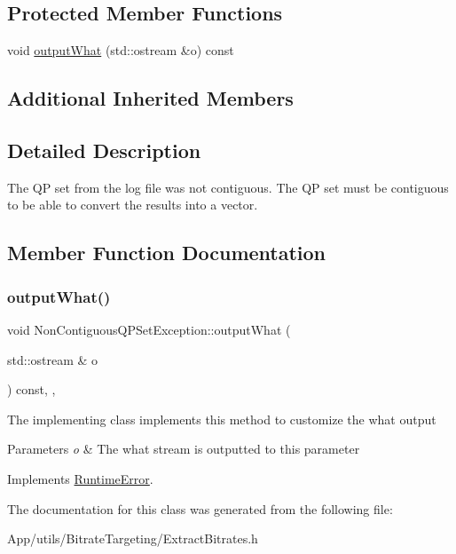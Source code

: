 \subsection*{Protected Member Functions}
\begin{DoxyCompactItemize}
\item 
void \hyperlink{class_non_contiguous_q_p_set_exception_a0b3c362380db281c07b3c8a016a73c32}{output\+What} (std\+::ostream \&o) const
\end{DoxyCompactItemize}
\subsection*{Additional Inherited Members}


\subsection{Detailed Description}
The QP set from the log file was not contiguous. The QP set must be contiguous to be able to convert the results into a vector. 

\subsection{Member Function Documentation}
\mbox{\label{class_non_contiguous_q_p_set_exception_a0b3c362380db281c07b3c8a016a73c32}} 
\subsubsection{\texorpdfstring{output\+What()}{outputWhat()}}
{\footnotesize\ttfamily void Non\+Contiguous\+Q\+P\+Set\+Exception\+::output\+What (\begin{DoxyParamCaption}\item[{std\+::ostream \&}]{o }\end{DoxyParamCaption}) const\hspace{0.3cm}{\ttfamily [inline]}, {\ttfamily [protected]}, {\ttfamily [virtual]}}

The implementing class implements this method to customize the what output 
\begin{DoxyParams}{Parameters}
{\em o} & The what stream is outputted to this parameter \\
\hline
\end{DoxyParams}


Implements \hyperlink{class_runtime_error_a5020b04a2a7fac8b1dbfbfe4a30055b0}{Runtime\+Error}.



The documentation for this class was generated from the following file\+:\begin{DoxyCompactItemize}
\item 
App/utils/\+Bitrate\+Targeting/Extract\+Bitrates.\+h\end{DoxyCompactItemize}
